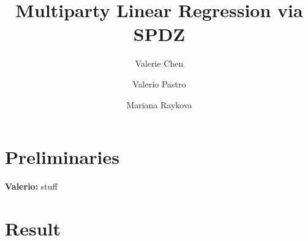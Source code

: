 \documentclass{article}
\title{Multiparty Linear Regression via SPDZ}
\author{Valerie Chen \and Valerio Pastro \and Mariana Raykova}
\theoremstyle{plain}
\theoremstyle{definition}
\theoremstyle{remark}
\newcommand{\vp}[1]{{\textcolor{dblue}{\textbf{Valerio:} #1}}}
\begin{document}
\titlepage
\maketitle

\pagebreak

\section{Preliminaries}
\vp{stuff}

\section{Result}
\end{document}
